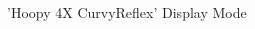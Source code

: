 \clearpage
\begin{figure}[H]
    \centering
    \begin{adjustbox}{width=12cm,center}
    \end{adjustbox}
\caption{'Hoopy 4X CurvyReflex' Display Mode}
\end{figure}


